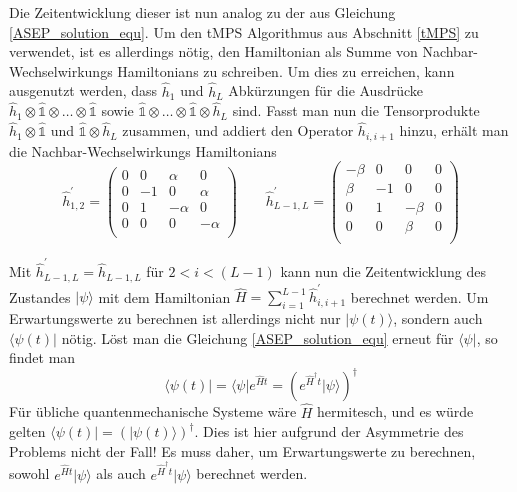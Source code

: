\documentclass[10pt,a4paper]{report}
\begin{document}
Die Zeitentwicklung dieser ist nun analog zu der aus Gleichung \ref{ASEP_solution_equ}. Um den tMPS Algorithmus aus Abschnitt \ref{tMPS} zu verwendet, ist es allerdings nötig, den Hamiltonian als Summe von Nachbar-Wechselwirkungs Hamiltonians zu schreiben. Um dies zu erreichen, kann ausgenutzt werden, dass $\hat{h}_1$ und $\hat{h}_L$ Abkürzungen für die Ausdrücke $\hat{h}_1\otimes\hat{\mathbb{1}}\otimes\ldots\otimes\hat{\mathbb{1}}$ sowie $\hat{\mathbb{1}}\otimes\ldots\otimes\hat{\mathbb{1}}\otimes\hat{h}_L$ sind. Fasst man nun die Tensorprodukte $\hat{h}_1\otimes\hat{\mathbb{1}}$ und $\hat{\mathbb{1}}\otimes\hat{h}_L$ zusammen, und addiert den Operator $\hat{h}_{i,i+1}$ hinzu, erhält man die Nachbar-Wechselwirkungs Hamiltonians
\begin{equation}
\hat{h}_{1,2}^\prime=
\begin{pmatrix}
0&0&\alpha&0\\
0&-1&0&\alpha\\
0&1&-\alpha&0\\
0&0&0&-\alpha\\
\end{pmatrix}
\qquad
\hat{h}_{L-1,L}^\prime=
\begin{pmatrix}
-\beta&0&0&0\\
\beta&-1&0&0\\
0&1&-\beta&0\\
0&0&\beta&0\\
\end{pmatrix}
\end{equation} 

Mit $\hat{h}_{L-1,L}^\prime=\hat{h}_{L-1,L}$ für $2<i<(L-1)$ kann nun die Zeitentwicklung des Zustandes $|\psi\rangle$ mit dem Hamiltonian $\hat{H}=\sum_{i=1}^{L-1} \hat{h}_{i,i+1}^\prime$ berechnet werden. Um Erwartungswerte zu berechnen ist allerdings nicht nur $|\psi(t)\rangle$, sondern auch $\langle\psi(t)|$ nötig. Löst man die Gleichung \ref{ASEP_solution_equ} erneut für $\langle\psi|$, so findet man
\begin{equation}
\langle\psi(t)|=\langle\psi|e^{\hat{H}t}=(e^{\hat{H}^\dagger t}|\psi\rangle)^\dagger
\end{equation}
Für übliche quantenmechanische Systeme wäre $\hat{H}$ hermitesch, und es würde gelten $\langle\psi(t)|=(|\psi(t)\rangle)^\dagger$. Dies ist hier aufgrund der Asymmetrie des Problems nicht der Fall! Es muss daher, um Erwartungswerte zu berechnen, sowohl $e^{\hat{H} t}|\psi\rangle$ als auch $e^{\hat{H}^\dagger t}|\psi\rangle$ berechnet werden.\\
\end{document}
